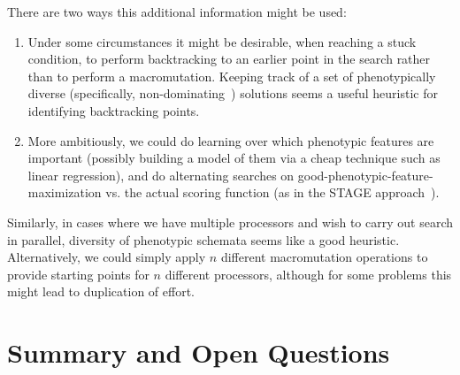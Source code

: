 \documentclass[letterpaper]{article}
\begin{document}
There are two ways this additional information might be used:
\begin{enumerate}
\item Under some circumstances it might be desirable, when reaching a stuck
  condition, to perform backtracking to an earlier point in the search rather
  than to perform a macromutation. Keeping track of a set of phenotypically
  diverse (specifically, non-dominating~\cite{pairwisecomp}) solutions seems a
  useful heuristic for identifying backtracking points.
\item More ambitiously, we could do learning over which phenotypic features are
  important (possibly building a model of them via a cheap technique such as
  linear regression), and do alternating searches on
  good-phenotypic-feature-maximization vs. the actual scoring function (as in
  the STAGE approach~\cite{stage}).
\end{enumerate}

Similarly, in cases where we have multiple processors and wish to carry out
search in parallel, diversity of phenotypic schemata seems like a good
heuristic. Alternatively, we could simply apply $n$ different macromutation
operations to provide starting points for $n$ different processors, although
for some problems this might lead to duplication of effort.

\section{Summary and Open Questions}
\end{document}
